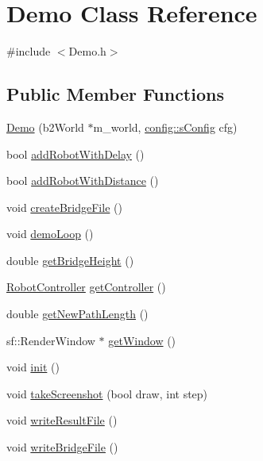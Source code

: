\hypertarget{class_demo}{}\section{Demo Class Reference}
\label{class_demo}


{\ttfamily \#include $<$Demo.\+h$>$}

\subsection*{Public Member Functions}
\begin{DoxyCompactItemize}
\item 
\mbox{\hyperlink{class_demo_a7fa722430ba973c538ae230e407854ab}{Demo}} (b2\+World $\ast$m\+\_\+world, \mbox{\hyperlink{structconfig_1_1s_config}{config\+::s\+Config}} cfg)
\item 
bool \mbox{\hyperlink{class_demo_a4636f708574c6be85334ff16373e2292}{add\+Robot\+With\+Delay}} ()
\item 
bool \mbox{\hyperlink{class_demo_a37b03d288a1bf67f586cdfe1f9ba16af}{add\+Robot\+With\+Distance}} ()
\item 
void \mbox{\hyperlink{class_demo_ae0f7fe82aa44b946c13823d408b9ee01}{create\+Bridge\+File}} ()
\item 
void \mbox{\hyperlink{class_demo_a5b12f30547c9f8e89d63ab84bf0cb95f}{demo\+Loop}} ()
\item 
double \mbox{\hyperlink{class_demo_ac6657b0f7f55a81ba215811d31d9e5b5}{get\+Bridge\+Height}} ()
\item 
\mbox{\hyperlink{class_robot_controller}{Robot\+Controller}} \mbox{\hyperlink{class_demo_af3f1105a11288fd13d54e85ef2485da5}{get\+Controller}} ()
\item 
double \mbox{\hyperlink{class_demo_acd4e28d1626c6979bbab2e396b717cba}{get\+New\+Path\+Length}} ()
\item 
sf\+::\+Render\+Window $\ast$ \mbox{\hyperlink{class_demo_a2b9c1e5275d36c3d82c0d4ee5d8a9741}{get\+Window}} ()
\item 
void \mbox{\hyperlink{class_demo_a585ce54e47b0624ca078492d9aa1c59c}{init}} ()
\item 
void \mbox{\hyperlink{class_demo_a8f833d4d73ccdb28cd2e4387fc3bb9e1}{take\+Screenshot}} (bool draw, int step)
\item 
void \mbox{\hyperlink{class_demo_a1b09c62228a007c49ddc0639a65341b2}{write\+Result\+File}} ()
\item 
void \mbox{\hyperlink{class_demo_a653b6b835b58959fea0758f2a1695002}{write\+Bridge\+File}} ()
\end{DoxyCompactItemize}
